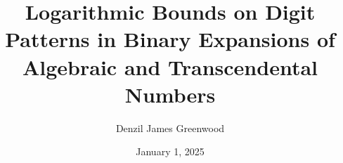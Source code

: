 
\title{\centering Logarithmic Bounds on Digit Patterns in Binary Expansions of Algebraic and Transcendental Numbers}
\author{Denzil James Greenwood}
\date{January 1, 2025}



\maketitle


\newpage




\newpage
{}
%
%





